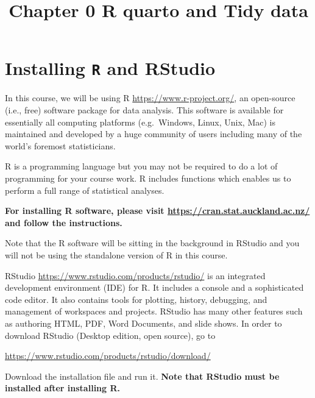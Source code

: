 \documentclass[
  letterpaper,
  DIV=11,
  numbers=noendperiod]{scrreprt}
\title{Chapter 0 R quarto and Tidy data}
\author{}
\date{}
\renewcommand*\contentsname{Table of contents}
\newcommand\contentsname{Table of contents}
\begin{document}
\maketitle
\ifdefined\Shaded\renewenvironment{Shaded}{\begin{tcolorbox}[sharp corners, frame hidden, breakable, boxrule=0pt, interior hidden, borderline west={3pt}{0pt}{shadecolor}, enhanced]}{\end{tcolorbox}}\fi

\renewcommand*\contentsname{Table of contents}
{
\hypersetup{linkcolor=}
\setcounter{tocdepth}{2}
\tableofcontents
}
\hypertarget{installing-r-and-rstudio}{%
\chapter{\texorpdfstring{Installing \texttt{R} and
RStudio}{Installing R and RStudio}}\label{installing-r-and-rstudio}}

In this course, we will be using R \url{https://www.r-project.org/}, an
open-source (i.e., free) software package for data analysis. This
software is available for essentially all computing platforms
(e.g.~Windows, Linux, Unix, Mac) is maintained and developed by a huge
community of users including many of the world's foremost statisticians.

R is a programming language but you may not be required to do a lot of
programming for your course work. R includes functions which enables us
to perform a full range of statistical analyses.

\textbf{For installing R software, please visit
\url{https://cran.stat.auckland.ac.nz/} and follow the instructions.}

Note that the R software will be sitting in the background in RStudio
and you will not be using the standalone version of R in this course.

RStudio \url{https://www.rstudio.com/products/rstudio/} is an integrated
development environment (IDE) for R. It includes a console and a
sophisticated code editor. It also contains tools for plotting, history,
debugging, and management of workspaces and projects. RStudio has many
other features such as authoring HTML, PDF, Word Documents, and slide
shows. In order to download RStudio (Desktop edition, open source), go
to

\url{https://www.rstudio.com/products/rstudio/download/}

Download the installation file and run it. \textbf{Note that RStudio
must be installed after installing R.}
\end{document}
